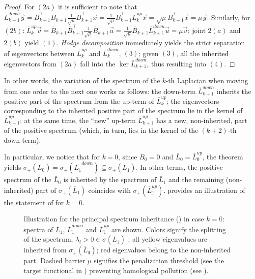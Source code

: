 \begin{proof}
For $(2a)$ it is sufficient to note that $ \bar L_{k+1}^{down} \vec y = \bar B_{k+1}^\top \bar B_{k+1} \frac{1}{\sqrt{\mu}} \bar B_{k+1}^\top \vec x = \frac{1}{\sqrt{\mu}}\bar B_{k+1}^\top \bar L_k^{up} \vec x = \sqrt \mu \bar B_{k+1}^\top \vec x  = \mu \vec y$. Similarly, for $(2b)$: $\bar L_k^{up} \vec v= \bar B_{k+1} \bar B_{k+1}^\top \frac{1}{\sqrt{\mu}} \bar B_{k+1} \vec u = \frac{1}{\sqrt{\mu}} \bar B_{k+1} \bar L_{k+1}^{down} \vec u = \mu \vec v $; joint $2(a)$ and $2(b)$ yield $(1)$. \emph{Hodge decomposition} immediately yields the strict separation of eigenvectors between $\bar L_k^{up}$ and $\bar L_k^{down}$, $(3)$; given $(3)$, all the inherited  eigenvectors from $(2a)$ fall into the $\ker \bar L_{k+1}^{down}$, thus resulting into $(4)$.
\end{proof}
In other words, the variation of the spectrum of the $k$-th Laplacian when moving from one order to the next one works as follows: 
the down-term $\bar L_{k+1}^{down}$ inherits the positive part of the spectrum from the up-term of  $\bar L_k^{up}$; the  eigenvectors corresponding to the inherited positive part of the spectrum lie in the kernel of $\bar L_{k+1}^{up}$; at the same time, the ``new'' up-term $\bar L_{k+1}^{up}$ has a new, non-inherited, part of the positive spectrum (which, in turn, lies in the kernel of the $(k+2)$-th down-term).

In particular, we notice that for $k = 0$, since $B_0=0$ and $\bar L_0=\bar L_0^{up}$, the  theorem yields $\sigma_+ (\bar L_0 ) = \sigma_+ (\bar{L_1}^{down}) \subseteq \sigma_+(\bar L_1)$. In other terms, the positive spectrum of the $\bar L_0$ is inherited by the spectrum of $\bar L_1$ and the remaining (non-inherited) part of $\sigma_+(\bar L_1)$ coincides with $\sigma_+(\bar L_1^{up})$. 
 provides an  illustration of the statement of   for $k = 0$.
  \begin{figure}[t]
    \centering
    
    \caption{Illustration for the principal spectrum inheritance () in case $k=0$: spectra of $\bar L_1$, $\bar L_1^{down}$ and $\bar L_1^{up}$ are shown. Colors signify the splitting of the spectrum, $\lambda_i>0 \in \sigma(\bar L_1)$ ; all yellow eigenvalues are inherited from $\sigma_+(\bar L_0)$; red eigenvalues belong to the non-inherited part. Dashed barrier $\mu$ signifies the penalization threshold (see the target functional in ) preventing homological pollution (see ). }
    \label{fig:thm_spct_ill}
    \vspace{-10pt}
  \end{figure}

























